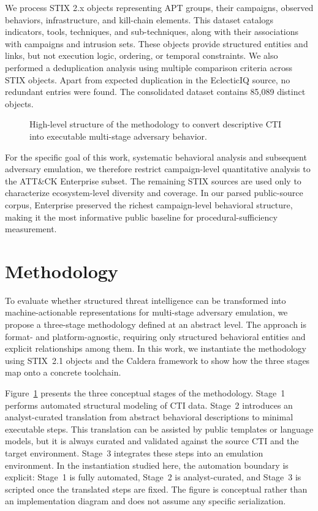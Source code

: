 \documentclass[sigconf]{acmart}
\newcommand{\stix}{STIX\xspace}
\newcommand{\attack}{ATT\&CK\xspace}
\newcommand{\caldera}{Caldera\xspace}
\begin{document}
We process \stix{} 2.x objects representing APT groups, their campaigns, observed behaviors, infrastructure, and kill-chain elements. This dataset catalogs indicators, tools, techniques, and sub-techniques, along with their associations with campaigns and intrusion sets. These objects provide structured entities and links, but not execution logic, ordering, or temporal constraints. We also performed a deduplication analysis using multiple comparison criteria across \stix{} objects. Apart from expected duplication in the EclecticIQ source, no redundant entries were found. The consolidated dataset contains 85,089 distinct objects.

\begin{figure}[!t]
  \centering
  \resizebox{\textwidth}{!}{}
  \caption{High-level structure of the methodology to convert descriptive CTI into executable multi-stage adversary behavior.}
  \label{fig:methodology-overview}
\end{figure}

For the specific goal of this work, systematic behavioral analysis and subsequent adversary emulation, we therefore restrict campaign-level quantitative analysis to the \attack{} Enterprise subset. The remaining \stix{} sources are used only to characterize ecosystem-level diversity and coverage. In our parsed public-source corpus, Enterprise preserved the richest campaign-level behavioral structure, making it the most informative public baseline for procedural-sufficiency measurement.


\section{Methodology}
\label{sec:methodology}

To evaluate whether structured threat intelligence can be transformed into machine-actionable representations for multi-stage adversary emulation, we propose a three-stage methodology defined at an abstract level. The approach is format- and platform-agnostic, requiring only structured behavioral entities and explicit relationships among them. In this work, we instantiate the methodology using \stix{}~2.1 objects and the \caldera{} framework to show how the three stages map onto a concrete toolchain.

Figure~\ref{fig:methodology-overview} presents the three conceptual stages of the methodology. Stage~1 performs automated structural modeling of CTI data. Stage~2 introduces an analyst-curated translation from abstract behavioral descriptions to minimal executable steps. This translation can be assisted by public templates or language models, but it is always curated and validated against the source CTI and the target environment. Stage~3 integrates these steps into an emulation environment. In the instantiation studied here, the automation boundary is explicit: Stage~1 is fully automated, Stage~2 is analyst-curated, and Stage~3 is scripted once the translated steps are fixed. The figure is conceptual rather than an implementation diagram and does not assume any specific serialization.
\end{document}
